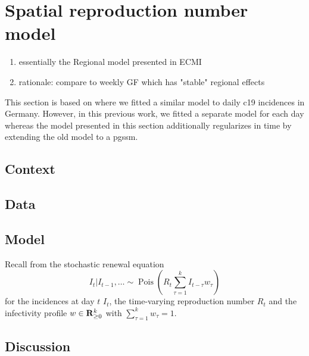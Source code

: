 \section{Spatial reproduction number model}%
\label{sec:spatial_reproduction_number_model}

\begin{enumerate}
    \item essentially the Regional model presented in ECMI
    \item rationale: compare to weekly GF which has "stable" regional effects
\end{enumerate}

This section is based on \citep{Burgard2021Regional} where we fitted a similar model to daily \acrshort{c19} incidences in Germany. However, in this previous work, we fitted a separate model for each day whereas the model presented in this section additionally regularizes in time by extending the old model to a \acrshort{pgssm}. 

\subsection{Context}
\subsection{Data}
\subsection{Model}
Recall from  the stochastic renewal equation  
$$
    I_{t} | I_{t - 1}, \dots \sim \operatorname{Pois} \left( R_{t} \sum_{\tau = 1}^k I_{t - \tau}w_{\tau}\right)
$$
for the incidences at day $t$ $I_{t}$, the time-varying reproduction number $R_{t}$ and the infectivity profile $w \in \mathbf R^{k}_{\geq 0}$ with $\sum_{\tau = 1}^{k} w_{\tau} = 1$.

\subsection{Discussion}